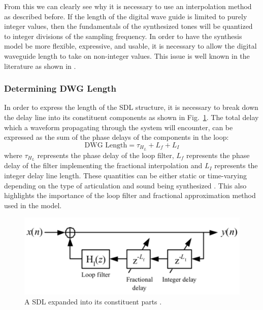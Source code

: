 \documentclass[main.tex]{subfiles}
\begin{document}
From this we can clearly see why it is necessary to use an interpolation method as described before. If the length of the digital wave guide is limited to purely integer values, then the fundamentals of the synthesized tones will be quantized to integer divisions of the sampling frequency. In order to have the synthesis model be more flexible, expressive, and usable, it is necessary to allow the digital waveguide length to take on non-integer values. This issue is well known in the literature as shown in .

\subsubsection{Determining DWG Length}
In order to express the length of the SDL structure, it is necessary to break down the delay line into its constituent components as shown in Fig.~\ref{fig:SDLBreakdown}. The total delay which a waveform propagating through the system will encounter, can be expressed as the sum of the phase delays of the components in the loop: 
\begin{equation}
    \text{DWG Length} = \tau_{H_L} + L_f + L_I
\end{equation}
where $\tau_{H_L}$ represents the phase delay of the loop filter, $L_f$ represents the phase delay of the filter implementing the fractional interpolation and $L_I$ represents the integer delay line length. These quantities can be either static or time-varying depending on the type of articulation and sound being synthesized . This also highlights the importance of the loop filter and fractional approximation method used in the model.

\begin{figure}[h]
    \centering
    \includegraphics[scale=1]{./images/diagrams/SDLModelExpanded.png}
    \caption{A SDL expanded into its constituent parts .}
    \label{fig:SDLBreakdown}
\end{figure}
\end{document}
